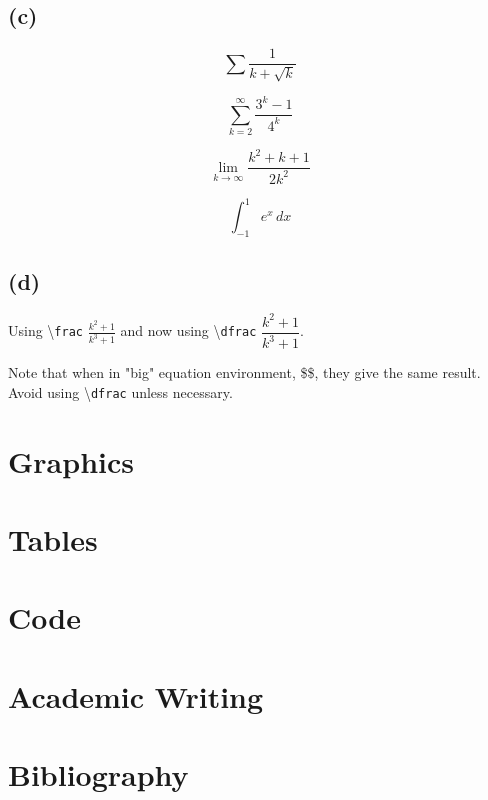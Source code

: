 \documentclass[11pt, a4paper]{article}
\begin{document}
\subsection{(c)} %

$$\sum \frac{1}{k+\sqrt{k}}$$

$$\sum\limits_{k=2}^\infty \frac{3^k-1}{4^k}$$

$$\lim_{k \to \infty} \frac{k^2 + k + 1}{2k^2}$$

$$\int_{-1}^{1} e^{x} \, dx$$

\subsection{(d)} %

Using \textbackslash \texttt{frac} $\frac{k^2+1}{k^3+1}$ and now using \textbackslash \texttt{dfrac} $\dfrac{k^2+1}{k^3+1}$.

Note that when in "big" equation environment, \$\$, they give the same result. Avoid using \textbackslash \texttt{dfrac} unless necessary.


\section{Graphics}



\section{Tables}



\section{Code}





\section{Academic Writing}




\section{Bibliography}
\end{document}
